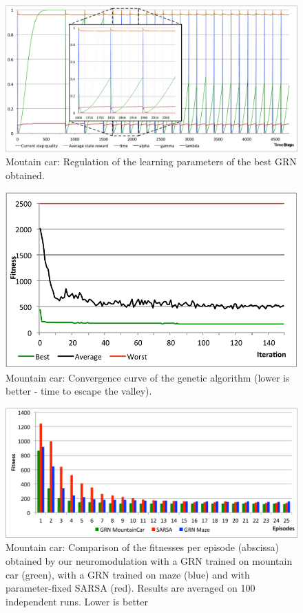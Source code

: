 \begin{figure}[h]
\center
\includegraphics[width=\linewidth]{MC_GRNBehavior.pdf}
\caption{Moutain car: Regulation of the learning parameters of the best GRN obtained.}\label{fig:MC:GRNBehavior}
\end{figure}

\begin{figure}[h]
\center
\includegraphics[width=0.75\linewidth]{MC_convergence.pdf}
\caption{Mountain car: Convergence curve of the genetic algorithm (lower is better - time to escape the valley).}\label{fig:MC:Convergence}
\end{figure}

\begin{figure}[h]
\center
\includegraphics[width=\linewidth]{MC_GRNvsSARSA.pdf}
\caption{Mountain car: Comparison of the fitnesses per episode (abscissa) obtained by our neuromodulation with a GRN trained on mountain car (green), with a GRN trained on maze (blue) and with parameter-fixed SARSA (red). Results are averaged on 100 independent runs. Lower is better}\label{fig:MC:GRNvsSARSA}
\end{figure}

